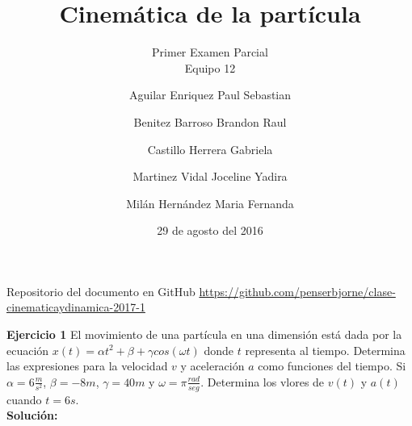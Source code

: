 \documentclass[a4paper,11pt]{scrartcl}
\title{Cinemática de la partícula}
\subtitle{Primer Examen Parcial \\ Equipo 12}
\author{
  Aguilar Enriquez Paul Sebastian\\
  \and
  Benitez Barroso Brandon Raul\\
  \and
  Castillo Herrera Gabriela\\
  \and
  Martinez Vidal Joceline Yadira\\
  \and
  Milán Hernández Maria Fernanda
  }
\date{29 de agosto del 2016}
\begin{document}
\maketitle

\begin{center}
  Repositorio del documento en GitHub
  \url{https://github.com/penserbjorne/clase-cinematicaydinamica-2017-1}
\end{center}

\textbf{Ejercicio 1} El movimiento de una partícula en una dimensión está dada por la ecuación $x(t)= \alpha t^{2} + \beta + \gamma cos(\omega t)$ donde $t$ representa al tiempo. Determina las expresiones para la velocidad $v$ y aceleración $a$ como funciones del tiempo. Si $\alpha = 6 \frac{m}{s^{2}}$, $\beta = -8 m$, $\gamma = 40 m$ y $\omega = \pi \frac{rad}{seg}$. Determina los vlores de $v(t)$ y $a(t)$ cuando $t = 6 s$.\\

\textbf{Solución:}
\end{document}
